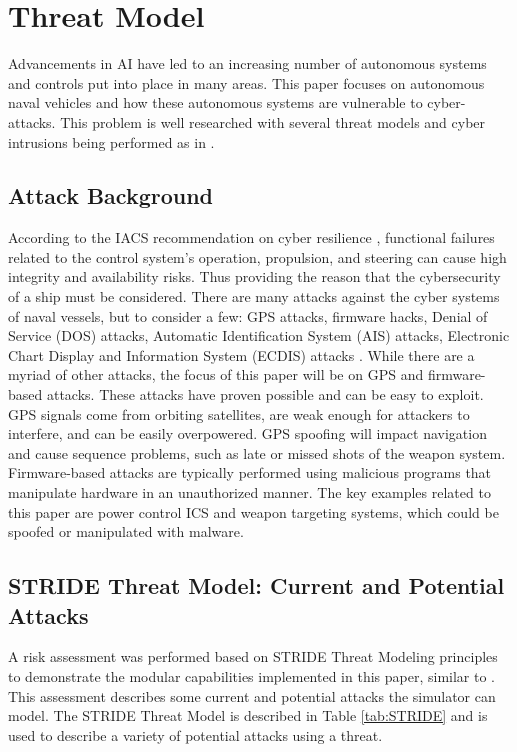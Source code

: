 \documentclass[conference]{IEEEtran}
\begin{document}
\section{Threat Model}
Advancements in AI have led to an increasing number of autonomous systems and controls put into place in many areas. This paper focuses on autonomous naval vehicles and how these autonomous systems are vulnerable to cyber-attacks. This problem is well researched with several threat models and cyber intrusions being performed as in \cite{b8}. 

\subsection{Attack Background}
According to the IACS recommendation on cyber resilience \cite{b13}, functional failures related to the control system's operation, propulsion, and steering can cause high integrity and availability risks. Thus providing the reason that the cybersecurity of a ship must be considered. There are many attacks against the cyber systems of naval vessels, but to consider a few: GPS attacks, firmware hacks, Denial of Service (DOS) attacks, Automatic Identification System (AIS) attacks, Electronic Chart Display and Information System (ECDIS) attacks \cite{b1}. While there are a myriad of other attacks, the focus of this paper will be on GPS and firmware-based attacks. These attacks have proven possible and can be easy to exploit. GPS signals come from orbiting satellites, are weak enough for attackers to interfere, and can be easily overpowered. GPS spoofing will impact navigation and cause sequence problems, such as late or missed shots of the weapon system. Firmware-based attacks are typically performed using malicious programs that manipulate hardware in an unauthorized manner. The key examples related to this paper are power control ICS and weapon targeting systems, which could be spoofed or manipulated with malware. 

\subsection{STRIDE Threat Model: Current and Potential Attacks}
A risk assessment was performed based on STRIDE Threat Modeling principles to demonstrate the modular capabilities implemented in this paper, similar to \cite{b8}. This assessment describes some current and potential attacks the simulator can model. The STRIDE Threat Model is described in Table \ref{tab:STRIDE} and is used to describe a variety of potential attacks using a threat.
\end{document}
